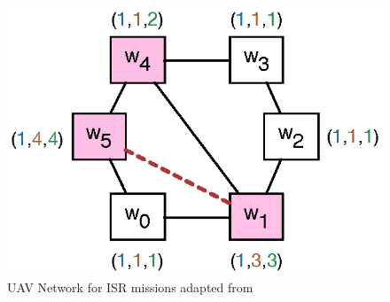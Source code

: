 \begin{figure}
\vspace{-11mm}
\centering
\includegraphics[scale=0.60]{Figs/uav.eps}\hspace{1.5em}\mbox{}
\vspace{-10mm}
\caption{UAV Network for ISR missions adapted from \cite{DBLP:conf/iccps/FengWHT15}} \label{fig:uav_game_map}
\end{figure}
%
